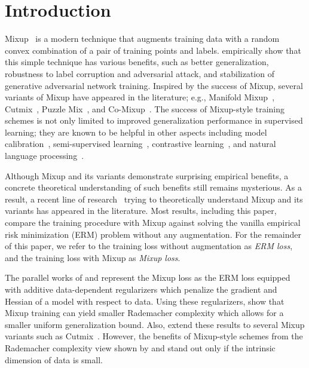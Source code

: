 \section{Introduction}
Mixup~\citep{zhang2018mixup} is a modern technique that augments training data with a random convex combination of a pair of training points and labels. \citet{zhang2018mixup} empirically show that this simple technique has various benefits, such as better generalization, robustness to label corruption and adversarial attack, and stabilization of generative adversarial network training. Inspired by the success of Mixup, several variants of Mixup have appeared in the literature; e.g., Manifold Mixup~\citep{verma2019manifold}, Cutmix~\citep{yun2019cutmix}, Puzzle Mix~\citep{kim2020puzzle}, and Co-Mixup~\citep{kim2021co}. The success of Mixup-style training schemes is not only limited to improved generalization performance in supervised learning; they are known to be helpful in other aspects including model calibration~\citep{thulasidasan2019mixup}, semi-supervised learning~\citep{berthelot2019mixmatch, sohn2020fixmatch}, contrastive learning~\citep{kalantidis2020hard, verma2021towards}, and natural language processing~\citep{guo2019augmenting, sun2020mixup}.

Although Mixup and its variants demonstrate surprising empirical benefits, a concrete theoretical understanding of such benefits still remains mysterious. As a result, a recent line of research~\citep{carratino2020mixup, zhang2020does, zhang2022and, chidambaram2021towards, chidambaram2022provably, parkunified} trying to theoretically understand Mixup and its variants has appeared in the literature. Most results, including this paper, compare the training procedure with Mixup against solving the vanilla empirical risk minimization (ERM) problem without any augmentation. For the remainder of this paper, we refer to the training loss without augmentation as \emph{ERM loss}, and the training loss with Mixup as \emph{Mixup loss}.

The parallel works of \citet{carratino2020mixup} and \citet{zhang2020does} represent the Mixup loss as the ERM loss equipped with additive data-dependent regularizers which penalize the gradient and Hessian of a model with respect to data. Using these regularizers, \citet{zhang2020does} show that Mixup training can yield smaller Rademacher complexity which allows for a smaller uniform generalization bound. Also, \citet{parkunified} extend these results to several Mixup variants such as Cutmix~\cite{yun2019cutmix}. However, the benefits of Mixup-style schemes from the Rademacher complexity view shown by \citet{zhang2020does} and \citet{parkunified} stand out only if the intrinsic dimension of data is small.


